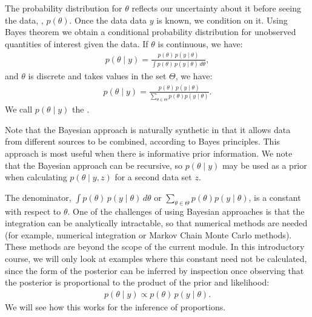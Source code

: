 \documentclass[letterpaper,10pt,english]{jupyterBook}
\begin{document}
\sphinxAtStartPar
The probability distribution for \(\theta\) reflects our uncertainty about it before seeing the data, , \(p(\theta)\). Once the data data \(y\) is known, we condition on it. Using Bayes theorem we obtain a conditional probability distribution for unobserved quantities of interest given the data. If \(\theta\) is continuous, we have:
\begin{equation*}
\begin{split}
p(\theta \mid y)= \frac{ p(\theta)\, p(y \mid \theta)}{\int  p(\theta)\,p(y \mid \theta)\,d\theta},
\end{split}
\end{equation*}
\sphinxAtStartPar
and \(\theta\) is discrete and takes values in the set \(\Theta\), we have:
\begin{equation*}
\begin{split}
p(\theta \mid y)= \frac{ p(\theta)\, p(y \mid \theta)}{\sum_{\theta \in \Theta}  p(\theta) p(y \mid \theta) }.
\end{split}
\end{equation*}
\sphinxAtStartPar
We call \(p(\theta \mid y)\) the .

\sphinxAtStartPar
Note that the Bayesian approach is naturally synthetic in that it allows data from different sources to be combined, according to Bayes principles. This approach is most useful when there is informative prior information. We note that the Bayesian approach can be recursive, so \(p(\theta \mid y)\) may be used as a prior when calculating \(p(\theta \mid y, z)\) for a second data set \(z\).

\sphinxAtStartPar
The denominator, \({\int  p(\theta)\,p(y \mid \theta)\,d\theta}\) or \(\sum_{\theta \in \Theta}  p(\theta) p(y \mid \theta)\), is a constant with respect to \(\theta\). One of the challenges of using Bayesian approaches is that the integration can be analytically intractable, so that numerical methods are needed (for example, numerical integration or Markov Chain Monte Carlo methods). These methods are beyond the scope of the current module. In this introductory course, we will only look at examples where this constant need not be calculated, since the form of the posterior can be inferred by inspection once observing that the posterior is proportional to the product of the prior and likelihood:
\begin{equation*}
\begin{split}p(\theta \mid y) \propto p(\theta)\,p(y \mid \theta).\end{split}
\end{equation*}
\sphinxAtStartPar
We will see how this works for the inference of proportions.
\end{document}
